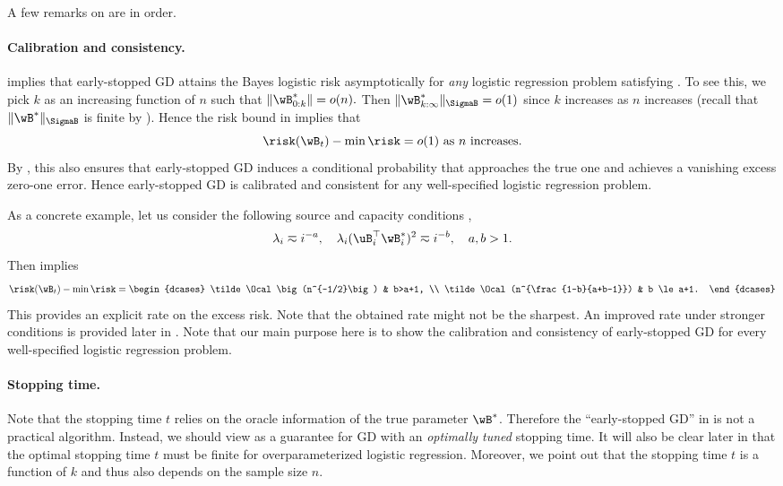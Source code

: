 \documentclass[11pt]{article}
\begin{document}
A few remarks on  are in order.

\paragraph{Calibration and consistency.}
 implies that early-stopped GD attains the Bayes logistic risk asymptotically for \emph{any} logistic regression problem satisfying .
To see this, we pick $k$ as an increasing function of $n$ such that 
\(
\|\wB^*_{0:k}\|=o(n).
\)
Then $\|\wB^*_{k:\infty}\|_{\SigmaB} = o(1)$ since $k$ increases as $n$ increases (recall that $\|\wB^*\|_{\SigmaB}$ is finite by ). Hence the risk bound in  implies that
\[\risk(\wB_t)-\min\risk= o(1)\ \text{as $n$ increases}.\]
By , this also ensures that early-stopped GD induces a conditional probability that approaches the true one and achieves a vanishing excess zero-one error. Hence early-stopped GD is calibrated and consistent for any well-specified logistic regression problem.

As a concrete example, let us consider the following source and capacity conditions \citep{caponnetto2007optimal}, 
\begin{equation}\label{eq:source-capacity}
    \lambda_i \eqsim i^{-a},\quad \lambda_i (\uB_i^\top \wB^*_i)^2 \eqsim i^{-b},\quad a,b>1.
\end{equation}
Then  implies 
\begin{align*}
    \risk(\wB_t) -\min\risk = \begin{dcases}
    \tilde\Ocal\big(n^{-1/2}\big) & b>a+1, \\
        \tilde\Ocal(n^{\frac{1-b}{a+b-1}}) & b \le a+1.
    \end{dcases}
\end{align*}
This provides an explicit rate on the excess risk. Note that the obtained rate might not be the sharpest. An improved rate under stronger conditions is provided later in . Note that our main purpose here is to show the calibration and consistency of early-stopped GD for every well-specified logistic regression problem. 

\paragraph{Stopping time.}
Note that the stopping time $t$ relies on the oracle information of the true parameter $\wB^*$. Therefore the ``early-stopped GD'' in  is not a practical algorithm. Instead, we should view  as a guarantee for GD with an \emph{optimally tuned} stopping time. It will also be clear later in  that the optimal stopping time $t$ must be finite for overparameterized logistic regression. 
Moreover, we point out that the stopping time $t$ is a function of $k$ and thus also depends on the sample size $n$.
\end{document}
